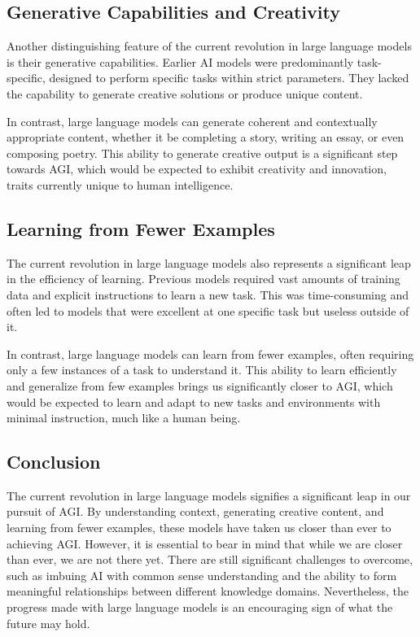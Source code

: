 \subsection{Generative Capabilities and Creativity}

Another distinguishing feature of the current revolution in large language models is their generative capabilities. Earlier AI models were predominantly task-specific, designed to perform specific tasks within strict parameters. They lacked the capability to generate creative solutions or produce unique content.

In contrast, large language models can generate coherent and contextually appropriate content, whether it be completing a story, writing an essay, or even composing poetry. This ability to generate creative output is a significant step towards AGI, which would be expected to exhibit creativity and innovation, traits currently unique to human intelligence.

\subsection{Learning from Fewer Examples}

The current revolution in large language models also represents a significant leap in the efficiency of learning. Previous models required vast amounts of training data and explicit instructions to learn a new task. This was time-consuming and often led to models that were excellent at one specific task but useless outside of it.

In contrast, large language models can learn from fewer examples, often requiring only a few instances of a task to understand it. This ability to learn efficiently and generalize from few examples brings us significantly closer to AGI, which would be expected to learn and adapt to new tasks and environments with minimal instruction, much like a human being.

\subsection{Conclusion}

The current revolution in large language models signifies a significant leap in our pursuit of AGI. By understanding context, generating creative content, and learning from fewer examples, these models have taken us closer than ever to achieving AGI. However, it is essential to bear in mind that while we are closer than ever, we are not there yet. There are still significant challenges to overcome, such as imbuing AI with common sense understanding and the ability to form meaningful relationships between different knowledge domains. Nevertheless, the progress made with large language models is an encouraging sign of what the future may hold.
